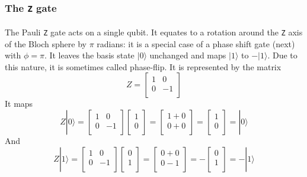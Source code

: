 \documentclass[a4paper,10pt]{article}
\begin{document}
\subsubsection{The \texttt{Z} gate}

\paragraph{} The Pauli \texttt{Z} gate acts on a single qubit. It equates to a rotation around the \texttt{Z} axis of the Bloch sphere by 
$\pi$ radians: it is a special case of a phase shift gate (next) with $\phi = \pi$. It leaves the basis state $|0\rangle$ unchanged and maps $|1\rangle$ to $-|1\rangle$. Due to this nature, it is sometimes called phase-flip. It is represented by the matrix
$$Z = \begin{bmatrix}
1 & 0 \\
0 & -1 \\
\end{bmatrix}$$
It maps
$$Z|0\rangle = \begin{bmatrix}
1 & 0 \\
0 & -1 \\
\end{bmatrix} \begin{bmatrix}
1 \\
0 \\
\end{bmatrix} = \begin{bmatrix}
1+0 \\
0+0 \\
\end{bmatrix} = \begin{bmatrix}
1 \\
0 \\
\end{bmatrix} = |0\rangle$$
And
$$Z|1\rangle = \begin{bmatrix}
1 & 0 \\
0 & -1 \\
\end{bmatrix} \begin{bmatrix}
0 \\
1 \\
\end{bmatrix} = \begin{bmatrix}
0+0 \\
0-1 \\
\end{bmatrix} = -\begin{bmatrix}
0 \\
1 \\
\end{bmatrix} = -|1\rangle$$
\end{document}
